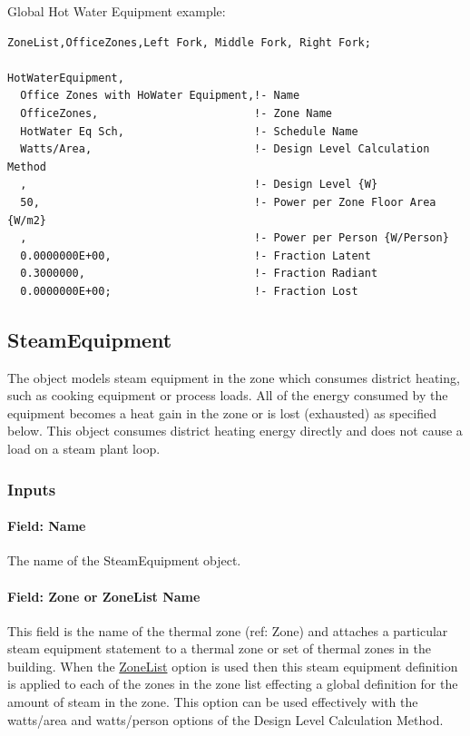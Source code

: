 Global Hot Water Equipment example:

\begin{lstlisting}
ZoneList,OfficeZones,Left Fork, Middle Fork, Right Fork;

HotWaterEquipment,
  Office Zones with HoWater Equipment,!- Name
  OfficeZones,                        !- Zone Name
  HotWater Eq Sch,                    !- Schedule Name
  Watts/Area,                         !- Design Level Calculation Method
  ,                                   !- Design Level {W}
  50,                                 !- Power per Zone Floor Area {W/m2}
  ,                                   !- Power per Person {W/Person}
  0.0000000E+00,                      !- Fraction Latent
  0.3000000,                          !- Fraction Radiant
  0.0000000E+00;                      !- Fraction Lost
\end{lstlisting}

\subsection{SteamEquipment}\label{steamequipment}

The object models steam equipment in the zone which consumes district heating, such as cooking equipment or process loads. All of the energy consumed by the equipment becomes a heat gain in the zone or is lost (exhausted) as specified below. This object consumes district heating energy directly and does not cause a load on a steam plant loop.

\subsubsection{Inputs}\label{inputs-6-012}

\paragraph{Field: Name}\label{field-name-6-009}

The name of the SteamEquipment object.

\paragraph{Field: Zone or ZoneList Name}\label{field-zone-or-zonelist-name-5}

This field is the name of the thermal zone (ref: Zone) and attaches a particular steam equipment statement to a thermal zone or set of thermal zones in the building. When the \hyperref[zonelist]{ZoneList} option is used then this steam equipment definition is applied to each of the zones in the zone list effecting a global definition for the amount of steam in the zone. This option can be used effectively with the watts/area and watts/person options of the Design Level Calculation Method.

